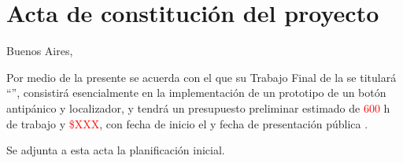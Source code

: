 \documentclass[
11pt, %
]{charter}
\begin{document}
\pagebreak



\section*{Acta de constitución del proyecto}
\label{sec:acta}

\begin{flushright}
Buenos Aires, \fechaInicioName
\end{flushright}

\vspace{2cm}

Por medio de la presente se acuerda con el \authorname\hspace{1px} que su Trabajo Final de la \degreename\hspace{1px} se titulará ``\ttitle'', consistirá esencialmente en la implementación de un prototipo de un botón antipánico y localizador, y tendrá un presupuesto preliminar estimado de \textcolor{red}{600} h de trabajo y \textcolor{red}{\$XXX}, con fecha de inicio el \fechaInicioName\hspace{1px} y fecha de presentación pública \fechaFinalName.

Se adjunta a esta acta la planificación inicial.

\vfill
\end{document}
